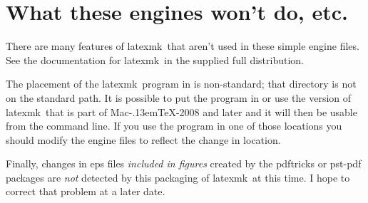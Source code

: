 \documentclass[11pt]{article}
\newcommand{\cmd}[1]{\textsf{#1}}
\newcommand{\MacTeX}{Mac\kern-.13em\TeX}
\newcommand{\TS}{\textsf{\TeX Shop}}
\newcommand{\latexmk}{\textsf{latexmk}}
\begin{document}
\section{What these engines won't do, etc.}

There are many features of \latexmk\ that aren't used in these simple \cmd{engine} files. See the documentation for \latexmk\ in the supplied full distribution.

The placement of the \latexmk\ program in  is non-standard; that directory is not on the standard path. It is possible to put the program in  or use the version of \latexmk\ that is part of \MacTeX-2008 and later and it will then be usable from the command line. If you use the program in one of those locations you should modify the \cmd{engine} files to reflect the change in location.



Finally, changes in \cmd{eps} files \emph{included in figures} created by the \cmd{pdftricks} or \cmd{pst-pdf} packages are \emph{not} detected by this packaging of \latexmk\ at this time. I hope to correct that problem at a later date.
\end{document}
